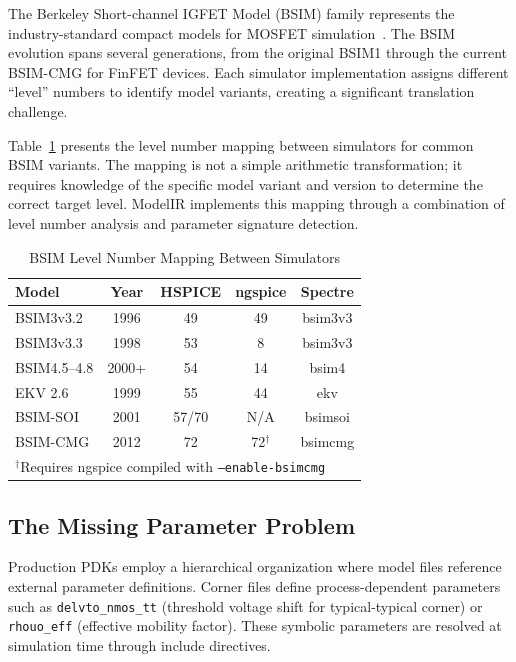 \documentclass[conference]{IEEEtran}
\begin{document}
The Berkeley Short-channel IGFET Model (BSIM) family represents the industry-standard compact models for MOSFET simulation~\cite{bsim4, bsim_history}. The BSIM evolution spans several generations, from the original BSIM1 through the current BSIM-CMG for FinFET devices. Each simulator implementation assigns different ``level'' numbers to identify model variants, creating a significant translation challenge.

Table~\ref{tab:bsim_levels} presents the level number mapping between simulators for common BSIM variants. The mapping is not a simple arithmetic transformation; it requires knowledge of the specific model variant and version to determine the correct target level. ModelIR implements this mapping through a combination of level number analysis and parameter signature detection.

\begin{table}[!t]
\caption{BSIM Level Number Mapping Between Simulators}
\label{tab:bsim_levels}
\centering
\renewcommand{\arraystretch}{1.15}
\begin{tabular}{@{}lcccc@{}}
\toprule
\textbf{Model} & \textbf{Year} & \textbf{HSPICE} & \textbf{ngspice} & \textbf{Spectre} \\
\midrule
BSIM3v3.2 & 1996 & 49 & 49 & bsim3v3 \\
BSIM3v3.3 & 1998 & 53 & 8 & bsim3v3 \\
BSIM4.5--4.8 & 2000+ & 54 & 14 & bsim4 \\
EKV 2.6 & 1999 & 55 & 44 & ekv \\
BSIM-SOI & 2001 & 57/70 & N/A & bsimsoi \\
BSIM-CMG & 2012 & 72 & 72$^\dagger$ & bsimcmg \\
\bottomrule
\multicolumn{5}{l}{\footnotesize $^\dagger$Requires ngspice compiled with \texttt{--enable-bsimcmg}}
\end{tabular}
\end{table}

\subsection{The Missing Parameter Problem}

Production PDKs employ a hierarchical organization where model files reference external parameter definitions. Corner files define process-dependent parameters such as \texttt{delvto\_nmos\_tt} (threshold voltage shift for typical-typical corner) or \texttt{rhouo\_eff} (effective mobility factor). These symbolic parameters are resolved at simulation time through include directives.
\end{document}
